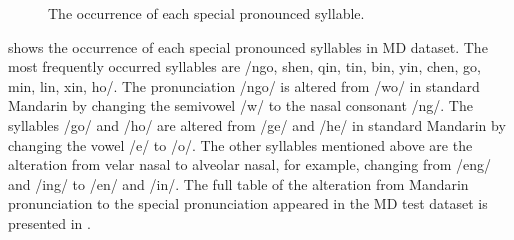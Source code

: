 \begin{figure}[ht!]
\caption{The occurrence of each special pronounced syllable.}
\label{fig:ch4:occurrence_special}
\end{figure}

 shows the occurrence of each special pronounced syllables in MD dataset. The most frequently occurred syllables are /ngo, shen, qin, tin, bin, yin, chen, go, min, lin, xin, ho/. The pronunciation /ngo/ is altered from /wo/ in standard Mandarin by changing the semivowel /w/ to the nasal consonant /ng/. The syllables /go/ and /ho/ are altered from /ge/ and /he/ in standard Mandarin by changing the vowel /e/ to /o/. The other syllables mentioned above are the alteration from velar nasal to alveolar nasal, for example, changing from /eng/ and /ing/ to /en/ and /in/. The full table of the alteration from Mandarin pronunciation to the special pronunciation appeared in the MD test dataset is presented in .

